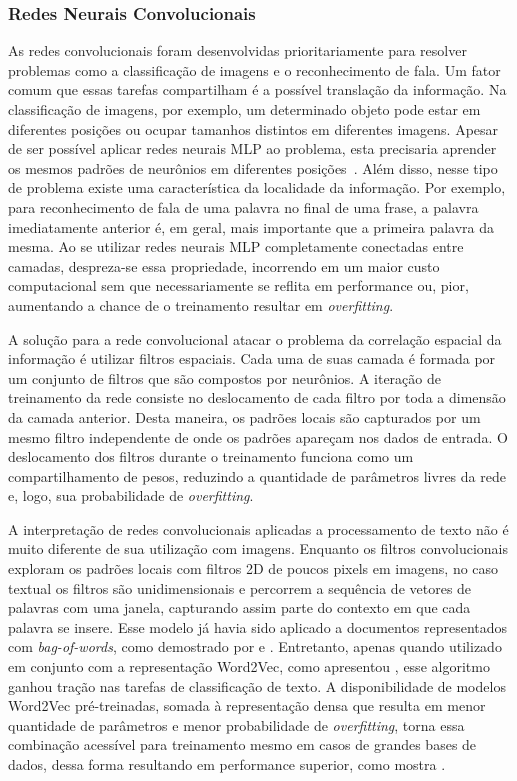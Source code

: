 
\subsubsection{Redes Neurais Convolucionais}

As redes convolucionais foram desenvolvidas prioritariamente para resolver
problemas como a classificação de imagens e o reconhecimento de fala.
Um fator comum que essas tarefas compartilham é a possível translação da
informação.
Na classificação de imagens, por exemplo, um determinado objeto pode estar em
diferentes posições ou ocupar tamanhos distintos em diferentes imagens.
Apesar de ser possível aplicar redes neurais MLP ao problema, esta precisaria
aprender os mesmos padrões de neurônios em diferentes posições~\cite{lecun95}.
Além disso, nesse tipo de problema existe uma característica da localidade da
informação.
Por exemplo, para reconhecimento de fala de uma palavra no final de uma frase,
a palavra imediatamente anterior é, em geral, mais importante que a primeira
palavra da mesma.
Ao se utilizar redes neurais MLP completamente conectadas entre camadas,
despreza-se essa propriedade, incorrendo em um maior custo computacional sem que
necessariamente se reflita em performance ou, pior, aumentando a chance de o
treinamento resultar em \textit{overfitting}.

A solução para a rede convolucional atacar o problema da correlação espacial da
informação é utilizar filtros espaciais.
Cada uma de suas camada é formada por um conjunto de filtros que são
compostos por neurônios.
A iteração de treinamento da rede consiste no deslocamento de cada filtro por
toda a dimensão da camada anterior.
Desta maneira, os padrões locais são capturados por um mesmo filtro
independente de onde os padrões apareçam nos dados de entrada.
O deslocamento dos filtros durante o treinamento funciona como um
compartilhamento de pesos, reduzindo a quantidade de parâmetros livres da rede
e, logo, sua probabilidade de \textit{overfitting}.

A interpretação de redes convolucionais aplicadas a processamento de texto não é
muito diferente de sua utilização com imagens.
Enquanto os filtros convolucionais exploram os padrões locais com filtros 2D de
poucos pixels em imagens, no caso textual os filtros são unidimensionais e
percorrem a sequência de vetores de palavras com uma janela, capturando assim
parte do contexto em que cada palavra se insere.
Esse modelo já havia sido aplicado a documentos representados com
\textit{bag-of-words}, como demostrado por \citet{kalchbrenner14} e
\citet{yih14}.
Entretanto, apenas quando utilizado em conjunto com a representação
Word2Vec, como apresentou \citet{kim14}, esse algoritmo ganhou tração nas
tarefas de classificação de texto.
A disponibilidade de modelos Word2Vec pré-treinadas, somada à representação
densa que resulta em menor quantidade de parâmetros e menor probabilidade de
\textit{overfitting}, torna essa combinação acessível para treinamento mesmo em
casos de grandes bases de dados, dessa forma resultando em performance superior,
como mostra \citet{kim14}.

